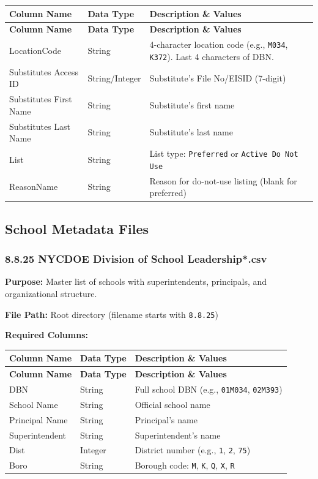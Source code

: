 \documentclass[12pt,letterpaper]{article}
\begin{document}
\begin{longtable}{p{3.5cm}p{2.5cm}p{7cm}}
\toprule
\textbf{Column Name} & \textbf{Data Type} & \textbf{Description \& Values} \\
\midrule
\endfirsthead
\toprule
\textbf{Column Name} & \textbf{Data Type} & \textbf{Description \& Values} \\
\midrule
\endhead
LocationCode & String & 4-character location code (e.g., \texttt{M034}, \texttt{K372}). Last 4 characters of DBN. \\
\midrule
Substitutes Access ID & String/Integer & Substitute's File No/EISID (7-digit) \\
\midrule
Substitutes First Name & String & Substitute's first name \\
\midrule
Substitutes Last Name & String & Substitute's last name \\
\midrule
List & String & List type: \texttt{Preferred} or \texttt{Active Do Not Use} \\
\midrule
ReasonName & String & Reason for do-not-use listing (blank for preferred) \\
\bottomrule
\end{longtable}

\subsection{School Metadata Files}

\subsubsection{8.8.25 NYCDOE Division of School Leadership*.csv}

\textbf{Purpose:} Master list of schools with superintendents, principals, and organizational structure.

\textbf{File Path:} Root directory (filename starts with \texttt{8.8.25})

\textbf{Required Columns:}

\begin{longtable}{p{3.5cm}p{2.5cm}p{7cm}}
\toprule
\textbf{Column Name} & \textbf{Data Type} & \textbf{Description \& Values} \\
\midrule
\endfirsthead
\toprule
\textbf{Column Name} & \textbf{Data Type} & \textbf{Description \& Values} \\
\midrule
\endhead
DBN & String & Full school DBN (e.g., \texttt{01M034}, \texttt{02M393}) \\
\midrule
School Name & String & Official school name \\
\midrule
Principal Name & String & Principal's name \\
\midrule
Superintendent & String & Superintendent's name \\
\midrule
Dist & Integer & District number (e.g., \texttt{1}, \texttt{2}, \texttt{75}) \\
\midrule
Boro & String & Borough code: \texttt{M}, \texttt{K}, \texttt{Q}, \texttt{X}, \texttt{R} \\
\bottomrule
\end{longtable}
\end{document}
